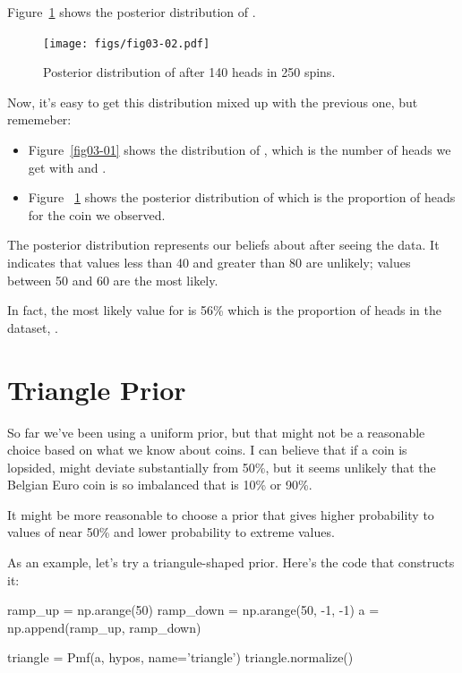 \documentclass[12pt]{book}
\theoremstyle{exercise}
\begin{document}
Figure~\ref{fig03-02} shows the posterior distribution of .

\begin{figure}
\centerline{\texttt{[image: figs/fig03-02.pdf]}}
\caption{Posterior distribution of  after 140 heads in 250 spins.}
\label{fig03-02}
\end{figure}

Now, it's easy to get this distribution mixed up with the previous one, but rememeber:

\begin{itemize}

\item Figure~\ref{fig03-01} shows the distribution of , which is the number of heads we get with  and .

\item Figure ~\ref{fig03-02} shows the posterior distribution of  which is the proportion of heads for the coin we observed. 

\end{itemize}

The posterior distribution represents our beliefs about  after seeing the data.
It indicates that values less than 40 and greater than 80 are unlikely; values between 50 and 60 are the most likely.

In fact, the most likely value for  is 56\% which is the proportion of heads in the dataset, .


\section{Triangle Prior}
\label{triangle}

So far we've been using a uniform prior, but that might not be a reasonable choice based on what we know about coins.  
I can believe that if a coin is lopsided,  might deviate substantially from 50\%, but it seems unlikely that the Belgian Euro coin is so imbalanced that  is 10\% or 90\%.

It might be more reasonable to choose a prior that gives
higher probability to values of  near 50\% and lower probability
to extreme values.


As an example, let's try a triangule-shaped prior.
Here's the code that constructs it:

\begin{code}
ramp_up = np.arange(50)
ramp_down = np.arange(50, -1, -1)
a = np.append(ramp_up, ramp_down)

triangle = Pmf(a, hypos, name='triangle')
triangle.normalize()
\end{code}
\end{document}
